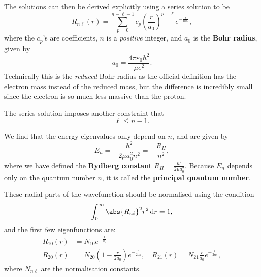 \documentclass[../quantum_mechanics.tex]{subfiles}
\begin{document}
            The solutions can then be derived explicitly using a series solution to be
            \begin{equation}
                R_{n\ell}(r)=\sum_{p=0}^{n-\ell-1}c_p\left(\frac{r}{a_0}\right)^{p+\ell}e^{-\frac{r}{na_0}},
            \end{equation}
            where the $c_p$'s are coefficients, $n$ is a \textit{positive} integer, and $a_0$ is the \textbf{Bohr radius}, given by
            \begin{equation}
                a_0=\frac{4\pi\varepsilon_0\hbar^2}{\mu e^2}.
            \end{equation}
            Technically this is the \textit{reduced} Bohr radius as the official definition has the electron mass instead of the reduced mass, but the difference is incredibly small since the electron is so much less massive than the proton.

            The series solution imposes another constraint that
            \begin{equation}
                \ell\leq n-1.
            \end{equation}

            We find that the energy eigenvalues only depend on $n$, and are given by
            \begin{equation}
                E_n=-\frac{\hbar^2}{2\mu a_0^2n^2}=-\frac{R_H}{n^2},
            \end{equation}
            where we have defined the \textbf{Rydberg constant} $R_H=\frac{\hbar^2}{2\mu a_0^2}$.
            Because $E_n$ depends only on the quantum number $n$, it is called the \textbf{principal quantum number}.

            These radial parts of the wavefunction should be normalised using the condition
            \begin{equation}
                \int_0^\infty\abs{R_{n\ell}}^2r^2\dd{r}=1,
            \end{equation}
            and the first few eigenfunctions are:
            \begin{align}
                R_{10}(r)&=N_{10}e^{-\frac{r}{a_0}}\\
                R_{20}(r)&=N_{20}\left(1-\frac{r}{2a_0}\right)e^{-\frac{r}{2a_0}},\quad R_{21}(r)=N_{21}\frac{r}{a_0}e^{-\frac{r}{2a_0}},
            \end{align}
            where $N_{n\ell}$ are the normalisation constants.
\end{document}
